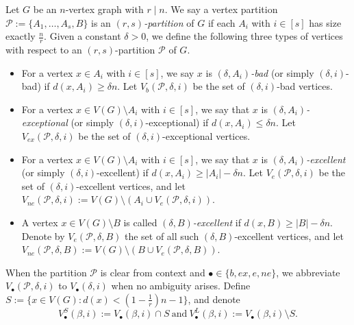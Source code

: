 \documentclass[11pt, a4paper]{article}
\theoremstyle{definition}
\newcommand{\<}{\subseteq}
\begin{document}
Let $G$ be an $n$-vertex graph with $r\mid n$. We say a vertex partition $\mathcal{P}:= \{A_1, \ldots, A_s, B\}$ is an \textit{$(r,s)$-partition} of $G$ if each $A_i$ with $i\in [s]$ has size exactly $\frac{n}{r}$. %
Given a constant $\delta>0$, we define the following three types of vertices with respect to an $(r,s)$-partition $\mathcal{P}$ of $G$. %
\begin{itemize}
    \item For a vertex $x\in A_i$ with $i\in [s]$, we say $x$ is \textit{$(\delta, A_i)$-bad} (or simply {$(\delta, i)$-bad}) if $d(x,A_i)\ge \delta n$. %
    Let $V_b(\mathcal{P},\delta,i)$ be the set of $(\delta,i)$-bad vertices.
    \item For a vertex $x\in V(G)\setminus A_i$ with $i\in [s]$, we say that  $x$ is \textit{$(\delta, A_i)$-exceptional} (or simply {$(\delta, i)$-exceptional}) if $d(x,A_i)\le \delta n$. %
    Let $V_{ex}(\mathcal{P},\delta,i)$ be the set of $(\delta,i)$-exceptional vertices. 
    \item For a vertex $x\in V(G)\setminus A_i$ with $i\in [s]$, we say that $x$ is \textit{$(\delta, A_i)$-excellent} (or simply {$(\delta, i)$-excellent}) if $d(x,A_i)\ge |A_i|-\delta n$. Let $V_e(\mathcal{P}, \delta,i)$ be the set of $(\delta ,i)$-excellent vertices, and let $V_{ne}(\mathcal{P}, \delta,i):=V(G)\setminus (A_i\cup V_e(\mathcal{P}, \delta,i))$. %
    
    \item A vertex $x\in V(G)\setminus B$ is called \textit{$(\delta,B)$-excellent} if $d(x,B)\ge |B|-\delta n$.  Denote by $V_e(\mathcal{P},\delta, B)$ the set of all such  $(\delta,B)$-excellent vertices, and let $V_{ne}(\mathcal{P},\delta, B):=V(G)\setminus (B\cup V_e(\mathcal{P}, \delta,B))$.
\end{itemize}

When the partition $\mathcal{P}$ is clear from context and  $\bullet\in \{b,ex,e,ne\}$,  we  abbreviate $V_{\bullet}(\mathcal{P},\delta,i)$ to $V_{\bullet}(\delta,i)$ when no ambiguity arises. Define  $S:=\{x\in V(G):d(x)<(1-\frac{1}{r})n-1\}$, and denote 
$$
V_{\bullet}^S(\beta,i):=V_{\bullet}(\beta,i)\cap S\ \text{and}\ V_{\bullet}^L(\beta,i):=V_{\bullet}(\beta,i)\setminus S.$$
\end{document}
